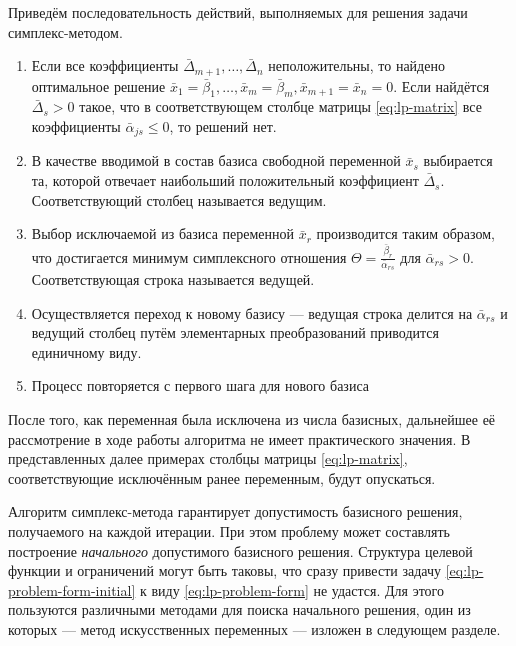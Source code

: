 Приведём последовательность действий, выполняемых для решения задачи
симплекс-методом.
\begin{enumerate}
  \renewcommand{\labelenumi}{\textbf{Шаг \arabic{enumi}.}}
\item Если все коэффициенты $\bar{\Delta}_{m+1}, \dotsc,
  \bar{\Delta}_n$ неположительны, то найдено оптимальное решение
  $\bar{x}_1 = \bar{\beta}_1, \dotsc, \bar{x}_m = \bar{\beta}_m,
  \bar{x}_{m+1} = \bar{x}_n = 0$. Если найдётся $\bar{\Delta}_s > 0$
  такое, что в соответствующем столбце матрицы \eqref{eq:lp-matrix}
  все коэффициенты $\bar{\alpha}_{js} \leq 0$, то решений нет.
\item В качестве вводимой в состав базиса свободной переменной
  $\bar{x}_s$ выбирается та, которой отвечает наибольший положительный
  коэффициент $\bar{\Delta}_s$. Соответствующий столбец называется
  ведущим.
\item Выбор исключаемой из базиса переменной $\bar{x}_r$ производится
  таким образом, что достигается минимум симплексного отношения
  $\Theta = \frac{\bar{\beta}_r}{\bar{\alpha}_{rs}}$ для
  $\bar{\alpha}_{rs} > 0$. Соответствующая строка называется ведущей.
\item Осуществляется переход к новому базису — ведущая строка делится
  на $\bar{\alpha}_{rs}$ и ведущий столбец путём элементарных
  преобразований приводится единичному виду.
\item Процесс повторяется с первого шага для нового базиса
\end{enumerate}

\begin{rem}
  \label{rem:omitting-free}
  После того, как переменная была исключена из числа базисных,
  дальнейшее её рассмотрение в ходе работы алгоритма не имеет
  практического значения. В представленных далее примерах столбцы
  матрицы \eqref{eq:lp-matrix}, соответствующие исключённым ранее
  переменным, будут опускаться.
\end{rem}

Алгоритм симплекс-метода гарантирует допустимость базисного решения,
получаемого на каждой итерации. При этом проблему может составлять
построение \emph{начального} допустимого базисного решения. Структура
целевой функции и ограничений могут быть таковы, что сразу привести
задачу \eqref{eq:lp-problem-form-initial} к виду
\eqref{eq:lp-problem-form} не удастся. Для этого пользуются различными
методами для поиска начального решения, один из которых — метод
искусственных переменных — изложен в следующем разделе.


